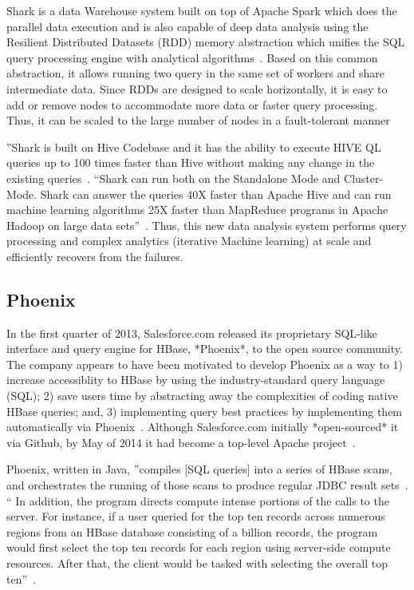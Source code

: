 Shark is a data Warehouse system built on top of Apache Spark which
does the parallel data execution and is also capable of deep data
analysis using the Resilient Distributed Datasets (RDD) memory
abstraction which unifies the SQL query processing engine with
analytical algorithms~\cite{shark-paper-2012}. Based on this common
abstraction, it allows running two query in the same set of workers
and share intermediate data. Since RDDs are designed to scale
horizontally, it is easy to add or remove nodes to accommodate more
data or faster query processing. Thus, it can be scaled to the large
number of nodes in a fault-tolerant manner

''Shark is built on Hive Codebase and it has the ability to execute
HIVE QL queries up to 100 times faster than Hive without making any
change in the existing queries~\cite{shark-paper-2012}. ``Shark can
run both on the Standalone Mode and Cluster-Mode. Shark can answer the
queries 40X faster than Apache Hive and can run machine learning
algorithms 25X faster than MapReduce programs in Apache Hadoop on
large data sets''~\cite{shark-paper-2012}. Thus, this new data
analysis system performs query processing and complex analytics
(iterative Machine learning) at scale and efficiently recovers from
the failures.

\subsection{Phoenix}

In the first quarter of 2013, Salesforce.com released its proprietary
SQL-like interface and query engine for HBase, *Phoenix*, to the open
source community.  The company appears to have been motivated to
develop Phoenix as a way to 1) increase accessiblity to HBase by using
the industry-standard query language (SQL); 2) save users time by
abstracting away the complexities of coding native HBase queries; and,
3) implementing query best practices by implementing them
automatically via Phoenix~\cite{www-phoenix-cloudera}. Although
Salesforce.com initially *open-sourced* it via Github, by May of 2014
it had become a top-level Apache project~\cite{www-phoenix-wikipedia}.

Phoenix, written in Java, ''compiles [SQL queries] into a series of
HBase scans, and orchestrates the running of those scans to produce
regular JDBC result sets~\cite{www-apachephoenix-org}. `` In addition,
the program directs compute intense portions of the calls to the
server.  For instance, if a user queried for the top ten records
across numerous regions from an HBase database consisting of a billion
records, the program would first select the top ten records for each
region using server-side compute resources.  After that, the client
would be tasked with selecting the overall top
ten''~\cite{www-phoenix-salesforcedev}.

